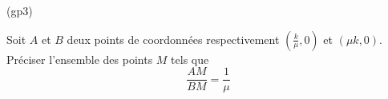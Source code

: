 \begin{tiny}(gp3)\end{tiny}
Soit $A$ et $B$ deux points de coordonn{\'e}es respectivement
$(\frac{k}{\mu},0)$ et $(\mu k , 0)$. Pr{\'e}ciser l'ensemble des
points $M$ tels que
\[\frac{AM}{BM}=\frac{1}{\mu}\]